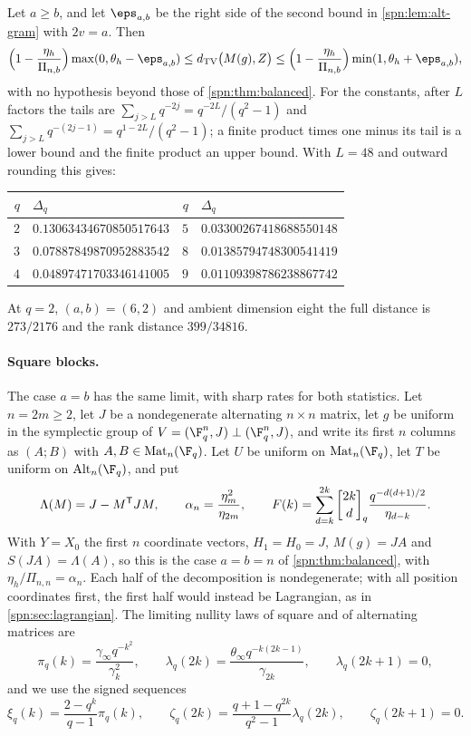 \begin{remark}\label{spn:rem:enclosure}
Let $a\ge b$, and let $\eps_{a,b}$ be the right side of the second bound in
\cref{spn:lem:alt-gram} with $2v=a$. Then
\[
 \Bigl(1-\frac{\eta_h}{\Pi_{n,b}}\Bigr)\max(0,\theta_h-\eps_{a,b})\le
 \spnTV\bigl(M(g),Z\bigr)\le
 \Bigl(1-\frac{\eta_h}{\Pi_{n,b}}\Bigr)\min(1,\theta_h+\eps_{a,b}),
\]
with no hypothesis beyond those of \cref{spn:thm:balanced}. For the constants, after $L$ factors
the tails are $\sum_{j>L}q^{-2j}=q^{-2L}/(q^2-1)$ and
$\sum_{j>L}q^{-(2j-1)}=q^{1-2L}/(q^2-1)$; a finite product times one minus its tail is a lower
bound and the finite product an upper bound. With $L=48$ and outward rounding this gives:
\begin{center}\small
\begin{tabular}{rlrl}
\toprule
$q$ & $\Delta_q$ & $q$ & $\Delta_q$\\
\midrule
$2$ & $0.13063434670850517643$ & $5$ & $0.03300267418688550148$\\
$3$ & $0.07887849870952883542$ & $8$ & $0.01385794748300541419$\\
$4$ & $0.04897471703346141005$ & $9$ & $0.01109398786238867742$\\
\bottomrule
\end{tabular}
\end{center}
At $q=2$, $(a,b)=(6,2)$ and ambient dimension eight the full distance is $273/2176$ and the rank
distance $399/34816$.
\end{remark}

\paragraph{Square blocks.}
The case $a=b$ has the same limit, with sharp rates for both statistics. Let $n=2m\ge2$, let $J$
be a nondegenerate alternating $n\times n$ matrix, let $g$ be uniform in the symplectic group of
$V=(\F_q^n,J)\perp(\F_q^n,J)$, and write its first $n$ columns as $(A;B)$ with
$A,B\in\spnMat_n(\F_q)$. Let $U$ be uniform on $\spnMat_n(\F_q)$, let $T$ be uniform on
$\spnAlt_n(\F_q)$, and put
\[
 \Lambda(M)=J-M^{\spnT}JM,\qquad \alpha_n=\frac{\eta_m^2}{\eta_{2m}},\qquad
 F(k)=\sum_{d=k}^{2k}\spnqbin{2k}{d}{q}\frac{q^{-d(d+1)/2}}{\eta_{d-k}} .
\]
With $Y=X_0$ the first $n$ coordinate vectors, $H_1=H_0=J$, $M(g)=JA$ and $S(JA)=\Lambda(A)$, so
this is the case $a=b=n$ of \cref{spn:thm:balanced}, with $\eta_h/\Pi_{n,n}=\alpha_n$. Each half
of the decomposition is nondegenerate; with all position coordinates first, the first half would
instead be Lagrangian, as in \cref{spn:sec:lagrangian}. The limiting nullity laws of square and of
alternating matrices are
\[
 \pi_q(k)=\frac{\gamma_\infty q^{-k^2}}{\gamma_k^2},\qquad
 \lambda_q(2k)=\frac{\theta_\infty q^{-k(2k-1)}}{\gamma_{2k}},\qquad \lambda_q(2k+1)=0,
\]
and we use the signed sequences
\[
 \xi_q(k)=\frac{2-q^k}{q-1}\pi_q(k),\qquad
 \zeta_q(2k)=\frac{q+1-q^{2k}}{q^2-1}\lambda_q(2k),\qquad \zeta_q(2k+1)=0.
\]

